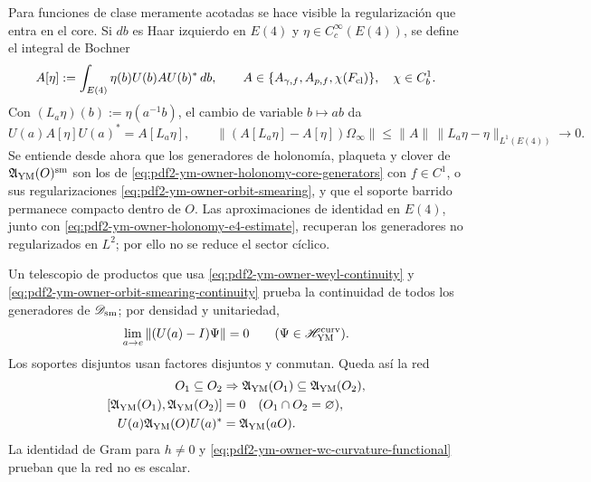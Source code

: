 Para funciones de clase meramente acotadas se hace visible la regularización que
entra en el core. Si $d b$ es Haar izquierdo en $E(4)$ y
$\eta\in C_c^\infty(E(4))$, se define el integral de Bochner
\begin{equation}\label{eq:pdf2-ym-owner-orbit-smearing}
 A[\eta]:=\int_{E(4)}\eta(b)U(b)AU(b)^*\,db,
 \qquad A\in\{A_{\gamma,f},A_{p,f},\chi(F_{{\rm cl}})\},
 \quad \chi\in C_b^1.
\end{equation}
Con $(L_a\eta)(b):=\eta(a^{-1}b)$, el cambio de variable $b\mapsto ab$ da
\begin{equation}\label{eq:pdf2-ym-owner-orbit-smearing-continuity}
 U(a)A[\eta]U(a)^*=A[L_a\eta],
 \qquad
 \|(A[L_a\eta]-A[\eta])\Omega_\infty\|
 \le\|A\|\,\|L_a\eta-\eta\|_{L^1(E(4))}\longrightarrow0.
\end{equation}
Se entiende desde ahora que los generadores de holonomía, plaqueta y clover de
$\mathfrak A_{\rm YM}(O)^{\rm sm}$ son los de
\eqref{eq:pdf2-ym-owner-holonomy-core-generators} con $f\in C^1$, o sus
regularizaciones \eqref{eq:pdf2-ym-owner-orbit-smearing}, y que el soporte barrido
permanece compacto dentro de $O$. Las aproximaciones de identidad en $E(4)$,
junto con \eqref{eq:pdf2-ym-owner-holonomy-e4-estimate}, recuperan los generadores
no regularizados en $L^2$; por ello no se reduce el sector cíclico.

Un telescopio de productos que usa
\eqref{eq:pdf2-ym-owner-weyl-continuity} y
\eqref{eq:pdf2-ym-owner-orbit-smearing-continuity} prueba la continuidad de todos
los generadores de $\mathscr D_{\rm sm}$; por
densidad y unitariedad,
\begin{equation}\label{eq:pdf2-ym-owner-strong-e4}
 \lim_{a\to e}\|(U(a)-I)\Psi\|=0
 \qquad(\Psi\in\mathscr H_{\rm YM}^{\rm curv}).
\end{equation}
Los soportes disjuntos usan factores disjuntos y conmutan. Queda así la red
\begin{equation}\label{eq:pdf2-ym-owner-local-net}
\begin{aligned}
 O_1\subseteq O_2&\Rightarrow
 \mathfrak A_{\rm YM}(O_1)\subseteq\mathfrak A_{\rm YM}(O_2),\\
 [\mathfrak A_{\rm YM}(O_1),\mathfrak A_{\rm YM}(O_2)]&=0
 \quad (O_1\cap O_2=\varnothing),\\
 U(a)\mathfrak A_{\rm YM}(O)U(a)^*&=\mathfrak A_{\rm YM}(aO).
\end{aligned}
\end{equation}
La identidad de Gram para $h\ne0$ y
\eqref{eq:pdf2-ym-owner-wc-curvature-functional} prueban que la red no es escalar.

